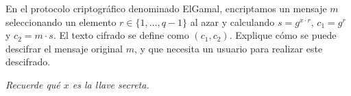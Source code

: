 En el protocolo criptográfico denominado ElGamal, encriptamos un mensaje $m$ seleccionando un elemento $r\in\{1,\ldots,q-1\}$ al azar y calculando $s=g^{x\cdot r}$, $c_1=g^r$ y $c_2=m\cdot s$. El texto cifrado se define como $(c_1, c_2)$. Explique cómo se puede descifrar el mensaje original $m$, y que necesita un usuario para realizar este descifrado.

\emph{Recuerde qué $x$ es la llave secreta.}
